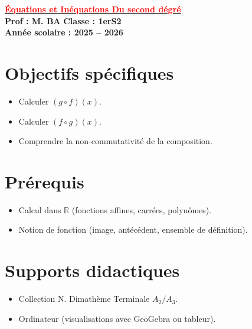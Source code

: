 \documentclass[12pt,a4paper]{article}
\begin{document}
\begin{center}
    \Large\textbf{\underline{\textcolor{red}{Équations et Inéquations Du second dégré}}}\\[-0.1cm]
    \normalsize\textbf{Prof : M. BA} \hfill \textbf{Classe : 1erS2}\\[-0.1cm]
    \textbf{Année scolaire : 2025 -- 2026}
\end{center}
\vspace{1em}

\section*{Objectifs spécifiques}
\begin{itemize}[label=$\checkmark$]
    \item Calculer \( (g \circ f)(x) \).
    \item Calculer \( (f \circ g)(x) \).
    \item Comprendre la non-commutativité de la composition.
\end{itemize}

\section*{Prérequis}
\begin{itemize}[label=$\checkmark$]
    \item Calcul dans \(\mathbb{R}\) (fonctions affines, carrées, polynômes).
    \item Notion de fonction (image, antécédent, ensemble de définition).
\end{itemize}

\section*{Supports didactiques}
\begin{itemize}[label=$\checkmark$]
    \item Collection N. Dimathème Terminale \( A_2 / A_3 \).
    \item Ordinateur (visualisations avec GeoGebra ou tableur).
\end{itemize}
\end{document}
